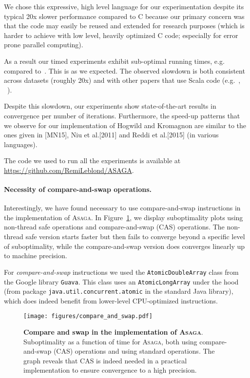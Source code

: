 \documentclass[twoside]{article}
\newcommand{\ASAGA}{\textsc{Asaga}}
\begin{document}
We chose this expressive, high level language for our experimentation despite its typical 20x slower performance compared to C because our primary concern was that the code may easily be reused and extended for research purposes (which is harder to achieve with low level, heavily optimized C code; especially for error prone parallel computing). 

As a result our timed experiments exhibit sub-optimal running times, e.g. compared to~\citet{KR13}.
This is as we expected.
The observed slowdown is both consistent across datasets (roughly 20x) and with other papers that use Scala code (e.g.~\citet{mania}, ~\citet[Fig. 2]{cocoa}).

Despite this slowdown, our experiments show state-of-the-art results in convergence per number of iterations.
Furthermore, the speed-up patterns that we observe for our implementation of Hogwild and Kromagnon are similar to the ones given in [MN15], Niu et al.[2011] and Reddi et al.[2015] (in various languages).

The code we used to run all the experiments is available at \url{https://github.com/RemiLeblond/ASAGA}.

\paragraph{Necessity of compare-and-swap operations.}
Interestingly, we have found necessary to use compare-and-swap instructions in the implementation of \ASAGA. 
In Figure~\ref{fig:cas_comparison}, we display suboptimality plots using non-thread safe operations and compare-and-swap (CAS) operations. The non-thread safe version starts faster but then fails to converge beyond a specific level of suboptimality, while the compare-and-swap version does converges linearly up to machine precision.

For \textit{compare-and-swap} instructions we used the \texttt{AtomicDoubleArray} class from the Google library \texttt{Guava}. This class uses an \texttt{AtomicLongArray} under the hood (from package \texttt{java.util.concurrent.atomic} in the standard Java library), which does indeed benefit from lower-level CPU-optimized instructions.

\begin{figure}
\center \texttt{[image: figures/compare\_and\_swap.pdf]}
\caption{{\bf Compare and swap in the implementation of \ASAGA}. 
Suboptimality as a function of time for \ASAGA, both using compare-and-swap (CAS) operations and using standard operations. 
The graph reveals that CAS is indeed needed in a practical implementation to ensure convergence to a high precision.} \label{fig:cas_comparison}
\end{figure}
\end{document}
